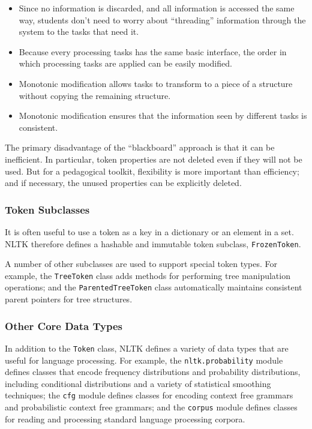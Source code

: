 \documentclass{article}
\begin{document}
\begin{itemize}
\item Since no information is discarded, and all information is
  accessed the same way, students don't need to worry about
  ``threading'' information through the system to the tasks that need
  it.
  
\item Because every processing tasks has the same basic interface, the
  order in which processing tasks are applied can be easily modified.  

\item Monotonic modification allows tasks to transform to a piece of a
  structure without copying the remaining structure.
  
\item Monotonic modification ensures that the information seen by
  different tasks is consistent.
\end{itemize}

\noindent The primary disadvantage of the ``blackboard'' approach is
that it can be inefficient.  In particular, token properties are not
deleted even if they will not be used.  But for a pedagogical toolkit,
flexibility is more important than efficiency; and if necessary, the
unused properties can be explicitly deleted.

\subsubsection{Token Subclasses}
It is often useful to use a token as a key in a dictionary or an
element in a set.  NLTK therefore defines a hashable and immutable
token subclass, \texttt{FrozenToken}.

A number of other subclasses are used to support special token types.
For example, the \texttt{TreeToken} class adds methods for performing
tree manipulation operations; and the \texttt{ParentedTreeToken} class
automatically maintains consistent parent pointers for tree
structures.

\subsubsection{Other Core Data Types}

In addition to the \texttt{Token} class, NLTK defines a variety of
data types that are useful for language processing.  For example, the
\texttt{nltk.probability} module defines classes that encode frequency
distributions and probability distributions, including conditional
distributions and a variety of statistical smoothing techniques; the
\texttt{cfg} module defines classes for encoding context free grammars
and probabilistic context free grammars; and the \texttt{corpus}
module defines classes for reading and processing standard language
processing corpora.
\end{document}
